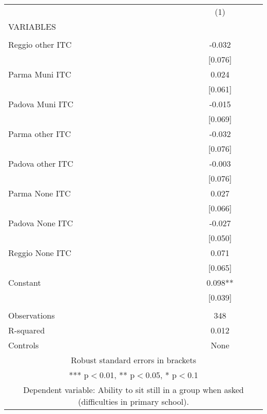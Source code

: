 \begin{tabular}{lc} \hline
 & (1) \\
VARIABLES &  \\ \hline
 &  \\
Reggio other ITC & -0.032 \\
 & [0.076] \\
Parma Muni ITC & 0.024 \\
 & [0.061] \\
Padova Muni ITC & -0.015 \\
 & [0.069] \\
Parma other ITC & -0.032 \\
 & [0.076] \\
Padova other ITC & -0.003 \\
 & [0.076] \\
Parma None ITC & 0.027 \\
 & [0.066] \\
Padova None ITC & -0.027 \\
 & [0.050] \\
Reggio None ITC & 0.071 \\
 & [0.065] \\
Constant & 0.098** \\
 & [0.039] \\
 &  \\
Observations & 348 \\
R-squared & 0.012 \\
 Controls & None \\ \hline
\multicolumn{2}{c}{ Robust standard errors in brackets} \\
\multicolumn{2}{c}{ *** p$<$0.01, ** p$<$0.05, * p$<$0.1} \\
\multicolumn{2}{c}{ Dependent variable: Ability to sit still in a group when asked (difficulties in primary school).} \\
\end{tabular}

